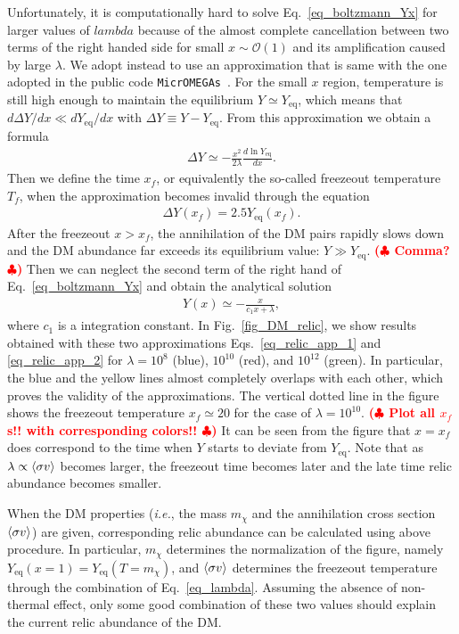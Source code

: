 \documentclass[12pt,twoside,book]{article}
\def\rem#1{ {\bf\textcolor{red}{($\clubsuit$ #1 $\clubsuit$)}}}
\begin{document}
Unfortunately, it is computationally hard to solve
Eq.~\eqref{eq_boltzmann_Yx} for larger values of $lambda$ because of
the almost complete cancellation between two terms of the right handed
side for small $x\sim \mathcal{O}(1)$ and its amplification caused by
large $\lambda$.  We adopt instead to use an approximation that is
same with the one adopted in the public code
\texttt{MicrOMEGAs}~\cite{Belanger:2001fz, Belanger:2018mqt}.  For the
small $x$ region, temperature is still high enough to maintain the
equilibrium $Y \simeq Y_{\mathrm{eq}}$, which means that $d \Delta Y /
d x \ll d Y_{\mathrm{eq}} / d x$ with $\Delta Y \equiv Y -
Y_{\mathrm{eq}}$.  From this approximation we obtain a formula
\begin{align}
 \Delta Y \simeq -\frac{x^2}{2 \lambda} \frac{d \ln Y_{\mathrm{eq}}}{d x}.\label{eq_relic_app_1}
\end{align}
Then we define the time $x_f$, or equivalently the so-called freezeout
temperature $T_f$, when the approximation becomes invalid through the
equation
\begin{align}
 \Delta Y (x_f) = 2.5 Y_{\mathrm{eq}} (x_f).
\end{align}
After the freezeout $x > x_f$, the annihilation of the DM pairs
rapidly slows down and the DM abundance far exceeds its equilibrium
value: $Y \gg Y_{\mathrm{eq}}$.  \rem{Comma?}  Then we can neglect the
second term of the right hand of Eq.~\eqref{eq_boltzmann_Yx} and
obtain the analytical solution
\begin{align}
 Y(x) \simeq - \frac{x}{c_1 x + \lambda},\label{eq_relic_app_2}
\end{align}
where $c_1$ is a integration constant.  In Fig.~\ref{fig_DM_relic}, we
show results obtained with these two approximations
Eqs.~\eqref{eq_relic_app_1} and \eqref{eq_relic_app_2} for $\lambda =
10^8$ (blue), $10^{10}$ (red), and $10^{12}$ (green).  In particular,
the blue and the yellow lines almost completely overlaps with each
other, which proves the validity of the approximations.  The vertical
dotted line in the figure shows the freezeout temperature $x_f \simeq
20$ for the case of $\lambda = 10^{10}$.  \rem{Plot all $x_f$s!! with
corresponding colors!!}  It can be seen from the figure that $x = x_f$
does correspond to the time when $Y$ starts to deviate from
$Y_{\mathrm{eq}}$.  Note that as $\lambda \propto \Braket{\sigma v}$
becomes larger, the freezeout time becomes later and the late time
relic abundance becomes smaller.

When the DM properties (\textit{i.e.}, the mass $m_\chi$ and the
annihilation cross section $\Braket{\sigma v}$) are given,
corresponding relic abundance can be calculated using above procedure.
In particular, $m_\chi$ determines the normalization of the figure,
namely $Y_{\mathrm{eq}} (x=1) = Y_{\mathrm{eq}} (T=m_\chi)$, and
$\Braket{\sigma v}$ determines the freezeout temperature through the
combination of Eq.~\eqref{eq_lambda}.  Assuming the absence of
non-thermal effect, only some good combination of these two values
should explain the current relic abundance of the DM.

\begin{appendices}
 
\end{appendices}

\clearpage



\end{document}

